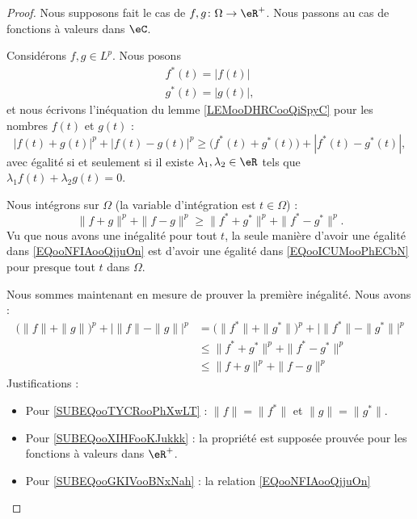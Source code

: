 \begin{proof}
    Nous supposons fait le cas de \( f,g\colon \Omega\to \eR^+\). Nous passons au cas de fonctions à valeurs dans \( \eC\).

    Considérons \( f,g\in L^p\). Nous posons
    \begin{subequations}
        \begin{align}
            f^*(t)=| f(t) |\\
            g^*(t)=| g(t) |,
        \end{align}
    \end{subequations}
    et nous écrivons l'inéquation du lemme \ref{LEMooDHRCooQiSpyC} pour les nombres \( f(t)\) et \( g(t)\) :
    \begin{equation}    \label{EQooICUMooPhECbN}
        \big| f(t)+g(t) \big|^p+\big| f(t)-g(t) \big|^p\geq \big(  f^*(t)+g^*(t) \big)+| f^*(t)-g^*(t) |,
    \end{equation}
    avec égalité si et seulement si il existe \( \lambda_1,\lambda_2\in \eR\) tels que \( \lambda_1f(t)+\lambda_2g(t)=0\).

    Nous intégrons sur \( \Omega\) (la variable d'intégration est \( t\in \Omega\)) :
    \begin{equation}        \label{EQooNFIAooQjjuOn}
        \| f+g \|^p+\| f-g \|^p\geq \| f^*+g^* \|^p+\| f^*-g^* \|^p.
    \end{equation}
    Vu que nous avons une inégalité pour tout \( t\), la seule manière d'avoir une égalité dans \eqref{EQooNFIAooQjjuOn} est d'avoir une égalité dans \eqref{EQooICUMooPhECbN} pour presque tout \( t\) dans \( \Omega\).
    
    Nous sommes maintenant en mesure de prouver la première inégalité. Nous avons :
    \begin{subequations}
        \begin{align}
            \big( \| f \|+\| g \| \big)^p+\big| \| f \|-\| g \| \big|^p
            &=\big( \| f^* \|+\| g^* \| \big)^p+\big| \| f^* \|-\| g^* \| \big|^p    \label{SUBEQooTYCRooPhXwLT}\\
            &\leq \| f^*+g^* \|^p+\| f^*-g^* \|^p       \label{SUBEQooXIHFooKJukkk}\\
            &\leq \| f+g \|^p+\| f-g \|^p   \label{SUBEQooGKIVooBNxNah}
        \end{align}
    \end{subequations}
    Justifications :
    \begin{itemize}
        \item Pour \ref{SUBEQooTYCRooPhXwLT} : \( \| f \|=\| f^* \|\) et \( \| g \|=\| g^* \|\).
        \item Pour \ref{SUBEQooXIHFooKJukkk} : la propriété est supposée prouvée pour les fonctions à valeurs dans \( \eR^+\).
        \item Pour \ref{SUBEQooGKIVooBNxNah} : la relation \eqref{EQooNFIAooQjjuOn}
    \end{itemize}

\end{proof}


